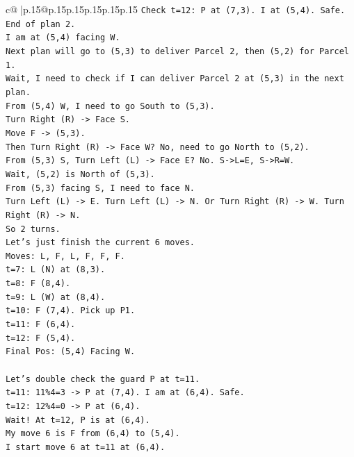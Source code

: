 \documentclass{article}
\begin{document}
{\begin{supertabular}{c@{$\;$}|p{.15\linewidth}@{}p{.15\linewidth}p{.15\linewidth}p{.15\linewidth}p{.15\linewidth}p{.15\linewidth}}
{{{\texttt{Check t=12: P at (7,3). I at (5,4). Safe.} \\
\texttt{End of plan 2.} \\
\texttt{I am at (5,4) facing W.} \\
\texttt{Next plan will go to (5,3) to deliver Parcel 2, then (5,2) for Parcel 1.} \\
\texttt{Wait, I need to check if I can deliver Parcel 2 at (5,3) in the next plan.} \\
\texttt{From (5,4) W, I need to go South to (5,3).} \\
\texttt{Turn Right (R) {-}> Face S.} \\
\texttt{Move F {-}> (5,3).} \\
\texttt{Then Turn Right (R) {-}> Face W? No, need to go North to (5,2).} \\
\texttt{From (5,3) S, Turn Left (L) {-}> Face E? No. S{-}>L=E, S{-}>R=W.} \\
\texttt{Wait, (5,2) is North of (5,3).} \\
\texttt{From (5,3) facing S, I need to face N.} \\
\texttt{Turn Left (L) {-}> E. Turn Left (L) {-}> N. Or Turn Right (R) {-}> W. Turn Right (R) {-}> N.} \\
\texttt{So 2 turns.} \\
\texttt{Let's just finish the current 6 moves.} \\
\texttt{Moves: L, F, L, F, F, F.} \\
\texttt{t=7: L (N) at (8,3).} \\
\texttt{t=8: F (8,4).} \\
\texttt{t=9: L (W) at (8,4).} \\
\texttt{t=10: F (7,4). Pick up P1.} \\
\texttt{t=11: F (6,4).} \\
\texttt{t=12: F (5,4).} \\
\texttt{Final Pos: (5,4) Facing W.} \\
\\ 
\texttt{Let's double check the guard P at t=11.} \\
\texttt{t=11: 11\%4=3 {-}> P at (7,4). I am at (6,4). Safe.} \\
\texttt{t=12: 12\%4=0 {-}> P at (6,4).} \\
\texttt{Wait! At t=12, P is at (6,4).} \\
\texttt{My move 6 is F from (6,4) to (5,4).} \\
\texttt{I start move 6 at t=11 at (6,4).} \\
}}}
\end{supertabular}}
\end{document}
